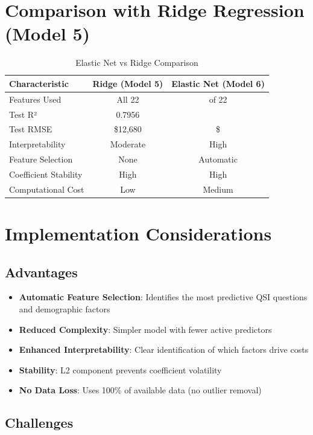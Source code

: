 \section{Comparison with Ridge Regression (Model 5)}

\begin{table}[h]
\centering
\caption{Elastic Net vs Ridge Comparison}
\begin{tabular}{lcc}
\toprule
\textbf{Characteristic} & \textbf{Ridge (Model 5)} & \textbf{Elastic Net (Model 6)} \\
\midrule
Features Used & All 22 & \ModelSixFeaturesSelected{} of 22 \\
Test R² & 0.7956 & \ModelSixRSquaredTest{} \\
Test RMSE & \$12,680 & \$\ModelSixRMSETest{} \\
Interpretability & Moderate & High \\
Feature Selection & None & Automatic \\
Coefficient Stability & High & High \\
Computational Cost & Low & Medium \\
\bottomrule
\end{tabular}
\end{table}

\section{Implementation Considerations}

\subsection{Advantages}

\begin{itemize}
    \item \textbf{Automatic Feature Selection}: Identifies the most predictive QSI questions and demographic factors
    \item \textbf{Reduced Complexity}: Simpler model with fewer active predictors
    \item \textbf{Enhanced Interpretability}: Clear identification of which factors drive costs
    \item \textbf{Stability}: L2 component prevents coefficient volatility
    \item \textbf{No Data Loss}: Uses 100\% of available data (no outlier removal)
\end{itemize}

\subsection{Challenges}

